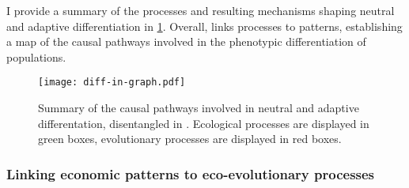 I provide a summary of the processes and resulting mechanisms shaping neutral and adaptive differentiation in \cref{fig:summary_diff-in-graph}. Overall, \chapi links processes to patterns, establishing a map of the causal pathways involved in the phenotypic differentiation of populations. %

\begin{figure}[t]
    \centering
    \texttt{[image: diff-in-graph.pdf]}
    \caption{Summary of the causal pathways involved in neutral and adaptive differentation, disentangled in \chapi. Ecological processes are displayed in green boxes, evolutionary processes are displayed in red boxes.}
    \label{fig:summary_diff-in-graph}
\end{figure}


\subsubsection{Linking economic patterns to eco-evolutionary processes}

